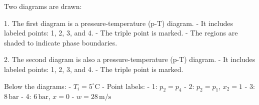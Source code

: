 Two diagrams are drawn:  

1. The first diagram is a pressure-temperature (p-T) diagram.  
   - It includes labeled points: 1, 2, 3, and 4.  
   - The triple point is marked.  
   - The regions are shaded to indicate phase boundaries.  

2. The second diagram is also a pressure-temperature (p-T) diagram.  
   - It includes labeled points: 1, 2, 3, and 4.  
   - The triple point is marked.  

Below the diagrams:  
- \( T_i = 5^\circ \text{C} \)  
- Point labels:  
  - 1: \( p_2 = p_4 \)  
  - 2: \( p_2 = p_1 \), \( x_2 = 1 \)  
  - 3: \( 8 \, \text{bar} \)  
  - 4: \( 6 \, \text{bar} \), \( x = 0 \)  
- \( w = 28 \, \text{m/s} \)